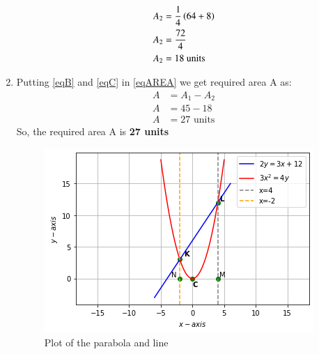 \documentclass[journal,12pt,twocolumn]{IEEEtran}
\begin{document}
\begin{enumerate}
\begin{align}
    A_2&= \frac{1}{4} \left(64 +8\right)
    \\
    A_2&= \frac{72}{4} 
    \\
    A_2&= 18 \text{ units} \label{eqC}
\end{align}
\item Putting \eqref{eqB} and \eqref{eqC} in \eqref{eqAREA} we get required area A as:
\begin{align}
 A &= A_1 -A_2 
 \\
 A &= 45-18
 \\
 A &= 27 \text{ units}
\end{align}
So, the required area A is \textbf{27 units}
\begin{figure}[ht]
\centering
\includegraphics[width=\columnwidth]{Parabola-Line.png}
\caption{Plot of the parabola and line}
\label{Plot of the Parabola and line}
\end{figure}
\end{enumerate}
\end{document}
